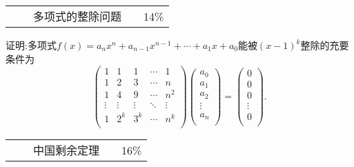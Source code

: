 \documentclass[a4paper]{article}
\begin{document}
\begin{spacing}{1.5}
\begin{table}[!ht]
	\renewcommand\arraystretch{2}
	\begin{tabular}{m{1cm}<{\centering}m{12cm}m{2cm}m{1.5cm}<{\centering}}
 \Large\cellcolor{black} \textcolor{white}{\textsf{04}}  & \large \cellcolor{lightgray}\textsf{多项式的整除问题} & &\cellcolor{lightgray} \large{14\%} \\
\end{tabular}
\end{table}
证明:多项式$f(x)=a_nx^n+a_{n-1}x^{n-1}+\cdots+a_1x+a_0$能被$(x-1)^k$整除的充要条件为
$$\left( \begin{matrix}
	1&		1&		1&		\cdots&		1\\
	1&		2&		3&		\cdots&		n\\
	1&		4&		9&		\cdots&		n^2\\
	\vdots&		\vdots&		\vdots&		\ddots&		\vdots\\
	1&		2^k&		3^k&		\cdots&		n^k\\
\end{matrix} \right) \left( \begin{matrix}
	a_0\\
	a_1\\
	a_2\\
	\vdots\\
	a_n\\
\end{matrix} \right) =\left( \begin{matrix}
	0\\
	0\\
	0\\
	\vdots\\
	0\\
\end{matrix} \right) .$$


\vspace{5mm}











\begin{table}[!ht]
	\renewcommand\arraystretch{2}
	\begin{tabular}{m{1cm}<{\centering}m{12cm}m{2cm}m{1.5cm}<{\centering}}
 \Large\cellcolor{black} \textcolor{white}{\textsf{05}}  & \large \cellcolor{lightgray}\textsf{中国剩余定理} & &\cellcolor{lightgray} \large{16\%} \\
\end{tabular}
\end{table}


\end{spacing}
\end{document}

